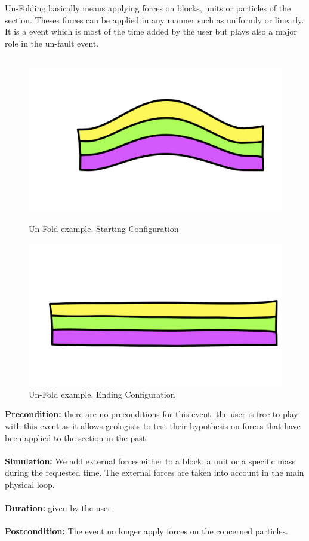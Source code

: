 \documentclass[12pt, a4paper]{memoir} %
\begin{document}
Un-Folding basically means applying forces on blocks, units or particles of the section. Theses forces can be applied in any manner such as uniformly or linearly. It is a event which is most of the time added by the user but plays also a major role in the un-fault event.\\\\
\begin{figure}[h]
    \begin{minipage}[c]{.46\linewidth}
        \centering
        \includegraphics[scale=0.2]{unFoldDescription0.png}
	\caption{Un-Fold example. Starting Configuration}
    \end{minipage}
    \hfill%
    \begin{minipage}[c]{.46\linewidth}
        \centering
        \includegraphics[scale=0.2]{unFoldDescription1.png}
	\caption{Un-Fold example. Ending Configuration}
    \end{minipage}
\end{figure}
\textbf{Precondition:} there are no preconditions for this event. the user is free to play with this event as it allows geologists to test their hypothesis on forces that have been applied to the section in the past.\\\\
\textbf{Simulation:} We add external forces either to a block, a unit or a specific mass during the requested time. The external forces are taken into account in the main physical loop.\\\\
\textbf{Duration:} given by the user.\\\\
\textbf{Postcondition:} The event no longer apply forces on the concerned particles.\\\\
\end{document}
